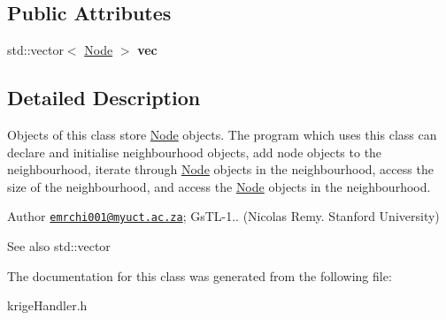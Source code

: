 \subsection*{Public Attributes}
\begin{DoxyCompactItemize}
\item 
\mbox{\label{classkrige__ce_1_1neighbourhood_a870b3b3bc046d53136947e60856a6984}} 
std\+::vector$<$ \hyperlink{classkrige__ce_1_1Node}{Node} $>$ {\bfseries vec}
\end{DoxyCompactItemize}


\subsection{Detailed Description}
Objects of this class store \hyperlink{classkrige__ce_1_1Node}{Node} objects. The program which uses this class can declare and initialise neighbourhood objects, add node objects to the neighbourhood, iterate through \hyperlink{classkrige__ce_1_1Node}{Node} objects in the neighbourhood, access the size of the neighbourhood, and access the \hyperlink{classkrige__ce_1_1Node}{Node} objects in the neighbourhood. 

\begin{DoxyAuthor}{Author}
\href{mailto:emrchi001@myuct.ac.za}{\tt emrchi001@myuct.\+ac.\+za}; Gs\+T\+L-\/1.. (Nicolas Remy. Stanford University) 
\end{DoxyAuthor}
\begin{DoxySeeAlso}{See also}
std\+::vector 
\end{DoxySeeAlso}


The documentation for this class was generated from the following file\+:\begin{DoxyCompactItemize}
\item 
krige\+Handler.\+h\end{DoxyCompactItemize}
